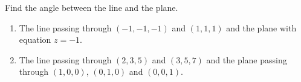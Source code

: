 Find the angle between the line and the plane.

\begin{enumerate}
\item The line passing through $(-1,-1,-1) $ and $(1 , 1, 1)$ and the plane with equation $z=-1$.

\item The line passing through $(2,3, 5)$ and $(3,5,7)$ and the plane passing through $(1,0,0)$, $(0,1,0)$ and $(0,0,1)$.
\end{enumerate}

\begin{comment}Calculator code solving the problem:
p0:=(2,3,5);
p1:=(3,5,7);
r:=p0-p1;
n:= (1,1,1);
\alpha:=((r n^t)_1)_1 /\sqrt{}(((n n^t)_1)_1)/  \sqrt{}(((r r^t)_1)_1); 
\arcsin (\alpha)
\end{comment}